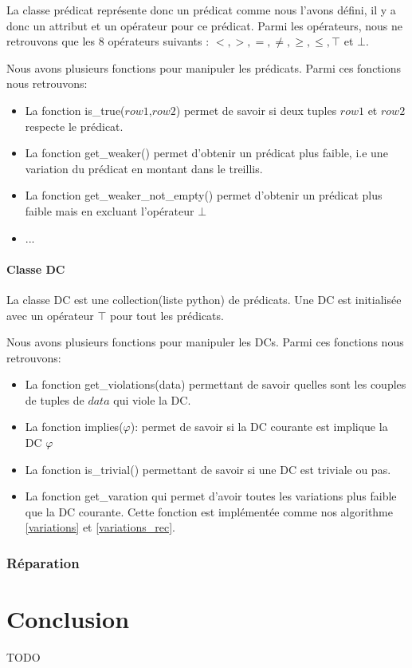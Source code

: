 \documentclass[letterpaper, 12pt]{report}
\theoremstyle{definition}
\begin{document}
La classe prédicat représente donc un prédicat comme nous l'avons défini, il y a donc un attribut et un opérateur pour ce prédicat. Parmi les opérateurs, nous ne retrouvons que les 8 opérateurs suivants : $ < , >, = , \neq , \geq , \leq , \top$ et $\bot $. 

Nous avons plusieurs fonctions pour manipuler les prédicats. Parmi ces fonctions nous retrouvons:
\begin{itemize}
\item La fonction is\_true($row1$,$row2$) permet de savoir si deux tuples $row1$ et $row2$ respecte le prédicat.
\item La fonction get\_weaker() permet d'obtenir un prédicat plus faible, i.e une variation du prédicat en montant dans le treillis.
\item La fonction get\_weaker\_not\_empty() permet d'obtenir un prédicat plus faible mais en excluant l'opérateur $\bot$
\item ...
\end{itemize}

\subsubsection{Classe DC}

La classe DC est une collection(liste python) de prédicats. Une DC est initialisée avec un opérateur $\top$ pour tout les prédicats.

Nous avons plusieurs fonctions pour manipuler les DCs. Parmi ces fonctions nous retrouvons:
\begin{itemize}
\item La fonction get\_violations(data) permettant de savoir quelles sont les couples de tuples de $data$ qui viole la DC.
\item La fonction implies($\varphi$): permet de savoir si la DC courante est implique la DC $\varphi$
\item La fonction is\_trivial() permettant de savoir si une DC est triviale ou pas.
\item La fonction get\_varation qui permet d'avoir toutes les variations plus faible que la DC courante. Cette fonction est implémentée comme nos algorithme \ref{variations} et \ref{variations_rec}.
\end{itemize}

\subsection{Réparation}
\chapter{Conclusion}
TODO






\newpage
\appendix
\end{document}
